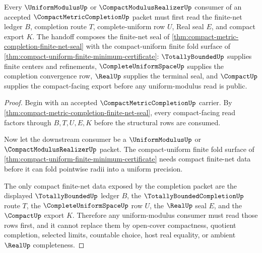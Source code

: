 \begin{theorem}
\label{thm:compact-metric-completion-uniform-modulus-seal}
Every $\UniformModulusUp$ or $\CompactModulusRealizerUp$ consumer of an accepted $\CompactMetricCompletionUp$ packet must first read the finite-net ledger $B$, completion route $T$, complete-uniform row $U$, Real seal $E$, and compact export $K$. The handoff composes the finite-net seal of \autoref{thm:compact-metric-completion-finite-net-seal} with the compact-uniform finite fold surface of \autoref{thm:compact-uniform-finite-minimum-certificate}: $\TotallyBoundedUp$ supplies finite centers and refinements, $\CompleteUniformSpaceUp$ supplies the completion convergence row, $\RealUp$ supplies the terminal seal, and $\CompactUp$ supplies the compact-facing export before any uniform-modulus read is public.
\end{theorem}
\begin{proof}
Begin with an accepted $\CompactMetricCompletionUp$ carrier. By \autoref{thm:compact-metric-completion-finite-net-seal}, every compact-facing read factors through $B,T,U,E,K$ before the structural rows are consumed.

Now let the downstream consumer be a $\UniformModulusUp$ or $\CompactModulusRealizerUp$ packet. The compact-uniform finite fold surface of \autoref{thm:compact-uniform-finite-minimum-certificate} needs compact finite-net data before it can fold pointwise radii into a uniform precision.

The only compact finite-net data exposed by the completion packet are the displayed $\TotallyBoundedUp$ ledger $B$, the $\TotallyBoundedCompletionUp$ route $T$, the $\CompleteUniformSpaceUp$ row $U$, the $\RealUp$ seal $E$, and the $\CompactUp$ export $K$. Therefore any uniform-modulus consumer must read those rows first, and it cannot replace them by open-cover compactness, quotient completion, selected limits, countable choice, host real equality, or ambient $\RealUp$ completeness.
\end{proof}

